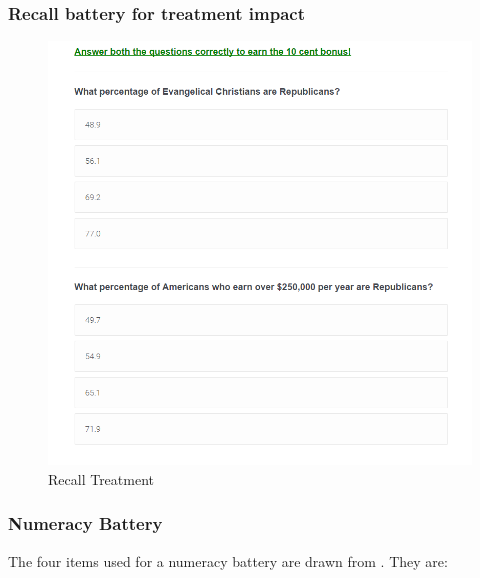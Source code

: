 \documentclass[12pt, letterpaper]{article}
\begin{document}
\subsubsection{Recall battery for treatment impact}
\begin{figure}[h!]
\begin{center}
\caption{Recall Treatment} \label{si_treat_fig}
\includegraphics[scale=0.5]{../figs/correct_bonus.png}
\end{center}
\end{figure}

\clearpage
\subsubsection{Numeracy Battery}
\label{oa:num_battery}

The four items used for a numeracy battery are drawn from \citet{weller2012development}. They are:
\end{document}
